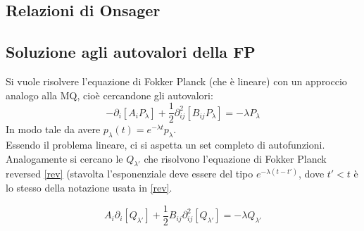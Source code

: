 \documentclass[a4paper,12pt]{article}
\theoremstyle{plain}
\theoremstyle{definition}
\newcommand{\f}[2]{\frac{#1}{#2}}
\theoremstyle{remark}
\begin{document}
\subsection{Relazioni di Onsager}
\subsection{Soluzione agli autovalori della FP}
Si vuole risolvere l'equazione di Fokker Planck (che è lineare) con un approccio analogo alla MQ, cioè cercandone gli autovalori:
\[-\partial_i	[A_iP_\lambda]	+\f{1}{2}\partial^2_{ij}[B_{ij}P_\lambda]=-\lambda P_\lambda	\]
In modo tale da avere $p_\lambda(t)=e^{-\lambda t} p_\lambda$.\\Essendo il problema lineare, ci si aspetta un set completo di autofunzioni.\\Analogamente si cercano le $Q_{\lambda'}$ che risolvono l'equazione di Fokker Planck reversed \ref{rev} (stavolta l'esponenziale deve essere del tipo $e^{-\lambda (t-t')}$, dove $t'<t$ è lo stesso della notazione usata in \ref{rev}.

\[A_i\partial_i	[Q_{\lambda'}]	+\f{1}{2}B_{ij}\partial^2_{ij}[Q_{\lambda'}]=-\lambda Q_{\lambda'}\]
\end{document}
